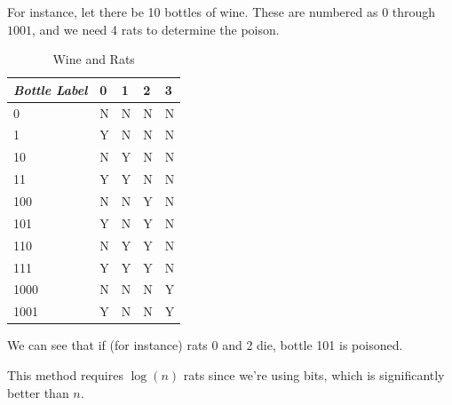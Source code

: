 \documentclass[10pt]{article}\usepackage[]{graphicx}\usepackage[]{xcolor}
\begin{document}
\begin{easylist}[enumerate]
    For instance, let there be 10 bottles of wine. These are numbered as $0$ through $1001$, and we need 4 rats to
    determine the poison.

    \begin{table}[H]
        \centering
        \begin{tabular}{|l||l|l|l|l|}
            \hline
            \textit{Bottle Label} & 0 & 1 & 2 & 3\\
            \hline
            \hline
            0 & N & N & N & N\\
            1 & Y & N & N & N\\
            10 & N & Y & N & N\\
            11 & Y & Y & N & N\\
            100 & N & N & Y & N\\
            101 & Y & N & Y & N\\
            110 & N & Y & Y & N\\
            111 & Y & Y & Y & N\\
            1000 & N & N & N & Y\\
            1001 & Y & N & N & Y\\
            \hline
        \end{tabular}
        \caption{Wine and Rats}
    \end{table}

    We can see that if (for instance) rats 0 and 2 die, bottle 101 is poisoned.\newline

    This method requires $\log(n)$ rats since we're using bits, which is significantly better than $n$.
\end{easylist}
\end{document}
